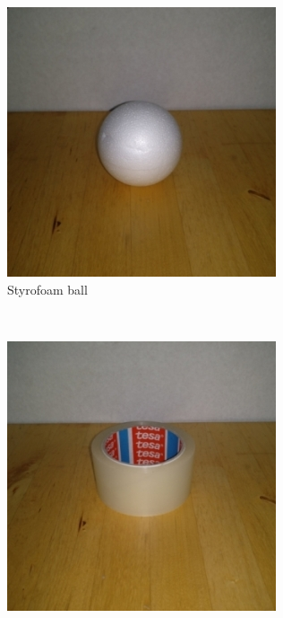 \documentclass[runningheads]{../llncs}
\begin{document}
\begin{figure}[h!]
    \centering
    \begin{subfigure}[t]{0.23\textwidth}
        \includegraphics[width=\textwidth]{object_ball}
        \caption{\scriptsize Styrofoam ball}
        \label{fig:object_ball}
    \end{subfigure}
    ~
    \begin{subfigure}[t]{0.23\textwidth}
        \includegraphics[width=\textwidth]{object_duct_tape}

\end{subfigure}
\end{figure}
\end{document}
